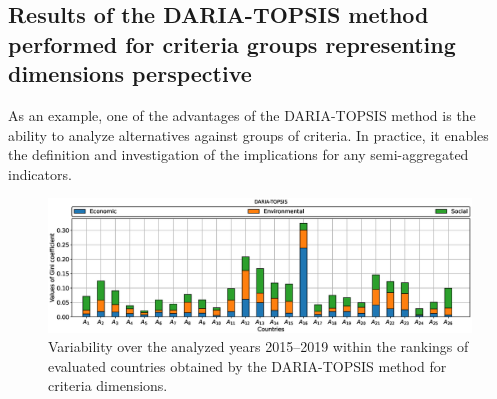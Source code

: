 \documentclass[final,5p,times,twocolumn,authoryear]{elsarticle}
\newcounter{example}[section]
\begin{document}
\subsection{Results of the DARIA-TOPSIS method performed for criteria groups representing dimensions perspective}
\label{sec:resultsDimensions}
As an example, one of the advantages of the DARIA-TOPSIS method is the ability to analyze alternatives against groups of criteria. In practice, it enables the definition and investigation of the implications for any semi-aggregated indicators.
%
%
\begin{figure}[ht!]
    \centering
    \includegraphics[width=0.8\linewidth]{topsis_dims_Gini_coefficient.eps}
    \caption{Variability over the analyzed years 2015--2019 within the rankings of evaluated countries obtained by the DARIA-TOPSIS method for criteria dimensions.}
    \label{fig:RankingsVariabilityDimensionsTOPSIS}
\end{figure}
%
%
\end{document}
